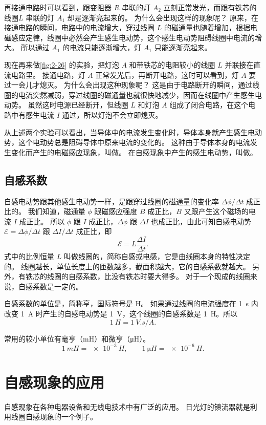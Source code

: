 再接通电路时可以看到，跟变阻器 $R$ 串联的灯 $A_2$ 立刻正常发光，而跟有铁芯的线圈$L$ 串联的灯 $A_1$ 却是逐渐亮起来的。
为什么会出现这样的现象呢？
原来，在接通电路的瞬间，电路中的电流增大，穿过线圈 $L$ 的磁通量也随着增加，根据电磁感应定律，线圈中必然会产生感生电动势，这个感生电动势阻碍线圈中电流的增大。
所以通过 $A_1$ 的电流只能逐渐增大，灯 $A_1$ 只能逐渐亮起来。

现在再来做\cref{fig:2-26} 的实验，把灯泡 $A$ 和带铁芯的电阻较小的线圈 $L$ 并联接在直流电路里。
接通电路，灯 $A$ 正常发光后，再断开电路，这时可以看到，灯 $A$ 要过一会儿才熄灭。
为什么会出现这种现象呢？
这是由于电路断开的瞬间，通过线圈的电流突然减弱，穿过线圈的磁通量也就很快地减少，因而在线圈中产生感生电动势。
虽然这时电源已经断开，但线圈 $L$ 和灯泡 $A$ 组成了闭合电路，在这个电路中有感生电流 $I$ 通过，所以灯泡不会立即熄灭。

从上述两个实验可以看出，当导体中的电流发生变化时，导体本身就产生感生电动势，这个电动势总是阻碍导体中原来电流的变化的。
这种由于导体本身的电流发生变化而产生的电磁感应现象，叫做。
在自感现象中产生的感生电动势，叫做。

\subsection{自感系数}
自感电动势跟其他感生电动势一样，是跟穿过线圈的磁通量的变化率 $\Delta\phi/\Delta t$ 成正比的。
我们知道，磁通量 $\phi$ 跟磁感应强度 $B$ 成正比，$B$ 又跟产生这个磁场的电流 $I$ 成正比。
所以 $\phi$ 跟 $I$ 成正比，$\Delta \phi$ 跟 $\Delta I$ 也成正比，由此可知自感电动势 $\mathcal{E}=\Delta\phi/\Delta t$ 跟 $\Delta I/\Delta t$ 成正比，即
\[\mathcal{E}=L\frac{\Delta I}{\Delta t}.\]
式中的比例恒量 $L$ 叫做线圈的，简称自感或电感，它是由线圈本身的特性决定的。
线圈越长，单位长度上的匝数越多，截面积越大，它的自感系数就越大。
另外，有铁芯的线圈的自感系数，比没有铁芯时要大得多。
对于一个现成的线圈来说，自感系数是一定的。

自感系数的单位是，简称亨，国际符号是 \unit{H}。
如果通过线圈的电流强度在 \qty{1}{s} 内改变 \qty{1}{A} 时产生的自感电动势是 \qty{1}{V}，这个线圈的自感系数是 \qty{1}{H}。所以
\[\qty{1}{H}=\qty{1}{V.s/A}.\]

常用的较小单位有毫亨（\unit{mH}）和微亨（\unit{\micro H}）。
\[\qty{1}{mH}=\qty{e-3}{H},\qquad \qty{1}{\micro H}=\qty{e-6}{H}.\]

\section{自感现象的应用}
自感现象在各种电器设备和无线电技术中有广泛的应用。
日光灯的镇流器就是利用线圈自感现象的一个例子。


